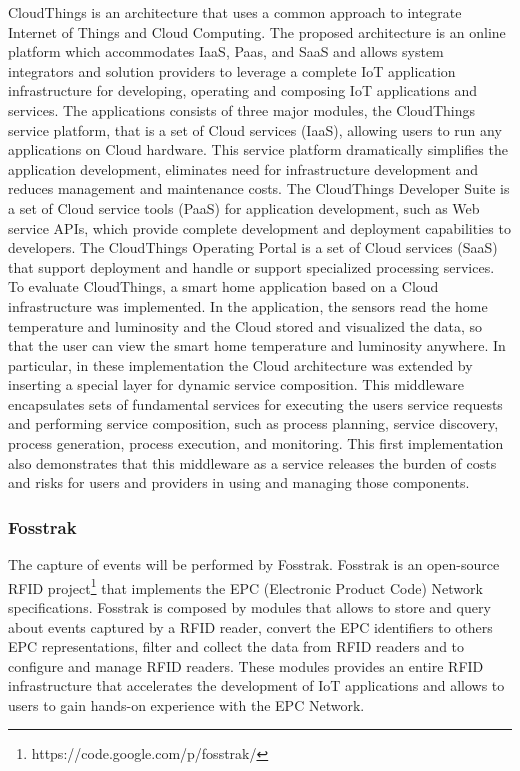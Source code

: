 CloudThings \cite{zhou2013cloudthings} is an architecture that uses a common approach
to integrate Internet of Things and Cloud Computing. The proposed architecture is an online
platform which accommodates IaaS, Paas, and SaaS and allows system integrators and solution
providers to leverage a complete IoT application infrastructure for developing, operating and
composing IoT applications and services. The applications consists of three major modules,
the CloudThings service platform, that is a set of Cloud services (IaaS), allowing users to
run any applications on Cloud hardware. This service platform dramatically simplifies the
application development, eliminates need for infrastructure development and reduces management
and maintenance costs. The CloudThings Developer Suite is a set of Cloud service tools (PaaS) for
application development, such as Web service APIs, which provide complete development and
deployment capabilities to developers. The CloudThings Operating Portal is a set of Cloud
services (SaaS) that support deployment and handle or support specialized processing services.
To evaluate CloudThings, a smart home application based on a Cloud infrastructure was implemented.
In the application, the sensors read the home temperature and luminosity and the Cloud
stored and visualized the data, so that the user can view the smart home temperature and luminosity
anywhere. In particular, in these implementation the Cloud architecture was extended by inserting
a special layer for dynamic service composition. This middleware encapsulates sets of fundamental
services for executing the users service requests and performing service composition, such as process planning,
service discovery, process generation, process execution, and monitoring. This first implementation
also demonstrates that this middleware as a service releases the burden of costs and risks for users and
providers in using and managing those components.\\
\subsubsection{Fosstrak}
\label{subs:fosstrak}
The capture of events will be performed by Fosstrak. Fosstrak is an open-source RFID
project\footnote{https://code.google.com/p/fosstrak/} that implements the EPC (Electronic Product Code)
Network specifications. Fosstrak is composed by modules that allows to store and query about
events captured by a RFID reader, convert the EPC identifiers to others EPC representations,
filter and collect the data from RFID readers and to configure and manage RFID readers.
These modules provides an entire RFID infrastructure that accelerates the development of
IoT applications and allows to users to gain hands-on experience with the EPC Network.\\
